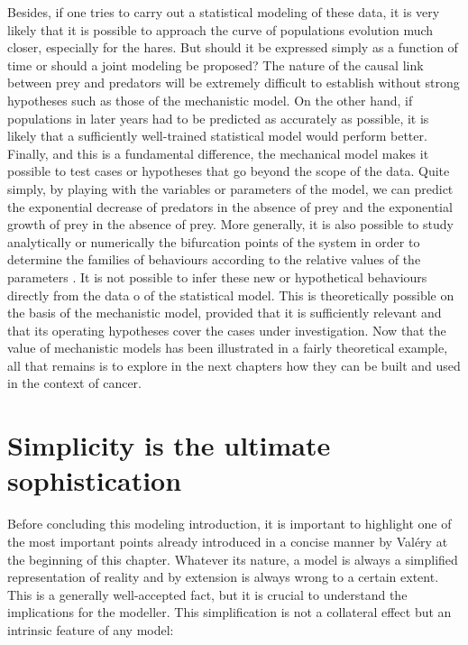 \documentclass[a4paper,12pt,twoside,onecolumn,openright,final,oldfontcommands]{memoir}
\begin{document}
Besides, if one tries to carry out a statistical modeling of these data,
it is very likely that it is possible to approach the curve of
populations evolution much closer, especially for the hares. But should
it be expressed simply as a function of time or should a joint modeling
be proposed? The nature of the causal link between prey and predators
will be extremely difficult to establish without strong hypotheses such
as those of the mechanistic model. On the other hand, if populations in
later years had to be predicted as accurately as possible, it is likely
that a sufficiently well-trained statistical model would perform better.
Finally, and this is a fundamental difference, the mechanical model
makes it possible to test cases or hypotheses that go beyond the scope
of the data. Quite simply, by playing with the variables or parameters
of the model, we can predict the exponential decrease of predators in
the absence of prey and the exponential growth of prey in the absence of
prey. More generally, it is also possible to study analytically or
numerically the bifurcation points of the system in order to determine
the families of behaviours according to the relative values of the
parameters \citep{flake1998computational}. It is not possible to infer
these new or hypothetical behaviours directly from the data o of the
statistical model. This is theoretically possible on the basis of the
mechanistic model, provided that it is sufficiently relevant and that
its operating hypotheses cover the cases under investigation. Now that
the value of mechanistic models has been illustrated in a fairly
theoretical example, all that remains is to explore in the next chapters
how they can be built and used in the context of cancer.

\section{Simplicity is the ultimate
sophistication}\label{simplicity-is-the-ultimate-sophistication}

Before concluding this modeling introduction, it is important to
highlight one of the most important points already introduced in a
concise manner by Valéry at the beginning of this chapter. Whatever its
nature, a model is always a simplified representation of reality and by
extension is always wrong to a certain extent. This is a generally
well-accepted fact, but it is crucial to understand the implications for
the modeller. This simplification is not a collateral effect but an
intrinsic feature of any model:
\end{document}
